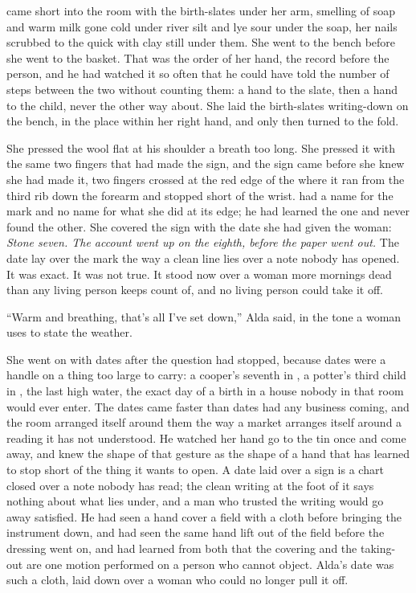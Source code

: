  came short into the room with the birth-slates under her arm, smelling of soap and warm milk gone cold under river silt and lye sour under the soap, her nails scrubbed to the quick with clay still under them. She went to the bench before she went to the basket. That was the order of her hand, the record before the person, and he had watched it so often that he could have told the number of steps between the two without counting them: a hand to the slate, then a hand to the child, never the other way about. She laid the birth-slates writing-down on the bench, in the place within her right hand, and only then turned to the fold.

She pressed the wool flat at his shoulder a breath too long. She pressed it with the same two fingers that had made the sign, and the sign came before she knew she had made it, two fingers crossed at the red edge of the  where it ran from the third rib down the forearm and stopped short of the wrist.  had a name for the mark and no name for what she did at its edge; he had learned the one and never found the other. She covered the sign with the date she had given the woman: \emph{Stone seven. The account went up on the eighth, before the paper went out.} The date lay over the mark the way a clean line lies over a note nobody has opened. It was exact. It was not true. It stood now over a woman more mornings dead than any living person keeps count of, and no living person could take it off.

“Warm and breathing, that's all I've set down,” Alda said, in the tone a woman uses to state the weather.

She went on with dates after the question had stopped, because dates were a handle on a thing too large to carry: a cooper's seventh in , a potter's third child in , the last high water, the exact day of a birth in a house nobody in that room would ever enter. The dates came faster than dates had any business coming, and the room arranged itself around them the way a market arranges itself around a reading it has not understood. He watched her hand go to the tin once and come away, and knew the shape of that gesture as the shape of a hand that has learned to stop short of the thing it wants to open. A date laid over a sign is a chart closed over a note nobody has read; the clean writing at the foot of it says nothing about what lies under, and a man who trusted the writing would go away satisfied. He had seen a hand cover a field with a cloth before bringing the instrument down, and had seen the same hand lift out of the field before the dressing went on, and had learned from both that the covering and the taking-out are one motion performed on a person who cannot object. Alda's date was such a cloth, laid down over a woman who could no longer pull it off.


